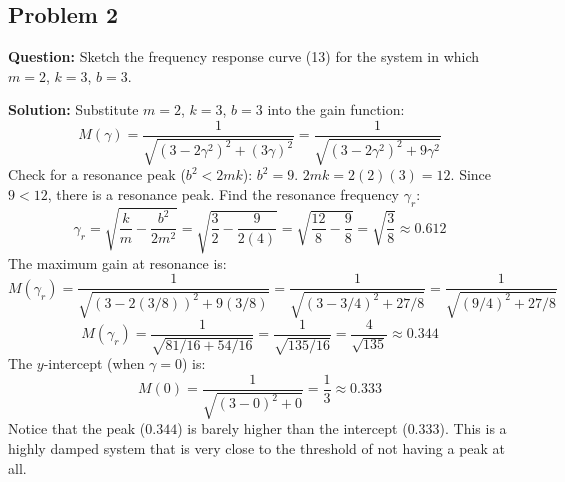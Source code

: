 \documentclass[11pt]{article}
\begin{document}
\begin{center}
\end{center}

\subsection{Problem 2}
\textbf{Question:} Sketch the frequency response curve (13) for the system in which $m = 2$, $k = 3$, $b = 3$.

\textbf{Solution:}
Substitute $m=2$, $k=3$, $b=3$ into the gain function:
\[ M(\gamma) = \frac{1}{\sqrt{(3-2\gamma^2)^2 + (3\gamma)^2}} = \frac{1}{\sqrt{(3-2\gamma^2)^2 + 9\gamma^2}} \]
Check for a resonance peak ($b^2 < 2mk$):
$b^2 = 9$. $2mk = 2(2)(3) = 12$.
Since $9 < 12$, there is a resonance peak.
Find the resonance frequency $\gamma_r$:
\[ \gamma_r = \sqrt{\frac{k}{m} - \frac{b^2}{2m^2}} = \sqrt{\frac{3}{2} - \frac{9}{2(4)}} = \sqrt{\frac{12}{8} - \frac{9}{8}} = \sqrt{\frac{3}{8}} \approx 0.612 \]
The maximum gain at resonance is:
\[ M(\gamma_r) = \frac{1}{\sqrt{(3-2(3/8))^2 + 9(3/8)}} = \frac{1}{\sqrt{(3-3/4)^2 + 27/8}} = \frac{1}{\sqrt{(9/4)^2 + 27/8}} \]
\[ M(\gamma_r) = \frac{1}{\sqrt{81/16 + 54/16}} = \frac{1}{\sqrt{135/16}} = \frac{4}{\sqrt{135}} \approx 0.344 \]
The $y$-intercept (when $\gamma = 0$) is:
\[ M(0) = \frac{1}{\sqrt{(3-0)^2 + 0}} = \frac{1}{3} \approx 0.333 \]
Notice that the peak ($0.344$) is barely higher than the intercept ($0.333$). This is a highly damped system that is very close to the threshold of not having a peak at all.

\begin{center}
\end{center}
\end{document}
